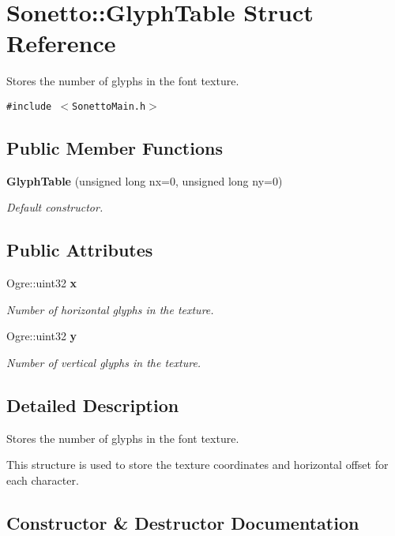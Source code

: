 \section{Sonetto::GlyphTable Struct Reference}
\label{struct_sonetto_1_1_glyph_table}
Stores the number of glyphs in the font texture.  


{\tt \#include $<$SonettoMain.h$>$}

\subsection*{Public Member Functions}
\begin{CompactItemize}
\item 
{\bf GlyphTable} (unsigned long nx=0, unsigned long ny=0)
\begin{CompactList}\small\item\em Default constructor. \item\end{CompactList}\end{CompactItemize}
\subsection*{Public Attributes}
\begin{CompactItemize}
\item 
Ogre::uint32 {\bf x}
\begin{CompactList}\small\item\em Number of horizontal glyphs in the texture. \item\end{CompactList}\item 
Ogre::uint32 {\bf y}
\begin{CompactList}\small\item\em Number of vertical glyphs in the texture. \item\end{CompactList}\end{CompactItemize}


\subsection{Detailed Description}
Stores the number of glyphs in the font texture. 

This structure is used to store the texture coordinates and horizontal offset for each character. 

\subsection{Constructor \& Destructor Documentation}
